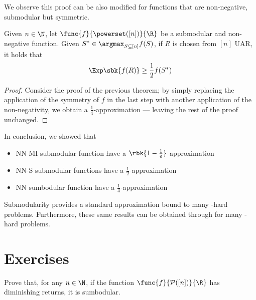 \documentclass[a4paper, 12pt]{report}
\begin{document}
    We observe this proof can be also modified for functions that are non-negative, submodular but  symmetric.

    \begin{framedthm}{}
        Given $n \in \N$, let $\func{f}{\powerset([n])}{\R}$ be a submodular and non-negative function. Given $\displaystyle S^* \in \argmax_{S \subseteq [n]}{f(S)}$, if $R$ is chosen from $[n]$ UAR, it holds that $$\Exp \sbk{f(R)} \ge \dfrac{1}{2}f(S^*)$$
    \end{framedthm}

    \begin{proof}
         Consider the proof of the previous theorem; by simply replacing the application of the symmetry of $f$ in the last step with another application of the non-negativity, we obtain a $\tfrac{1}{4}$-approximation --- leaving the rest of the proof unchanged.
    \end{proof}

    In conclusion, we showed that
    
    \begin{itemize}
        \item NN-MI submodular function have a $\rbk{1 - \tfrac{1}{e}}$-approximation
        \item NN-S submodular functions have a $\tfrac{1}{2}$-approximation
        \item NN sumbodular function have a $\tfrac{1}{4}$-approximation
    \end{itemize}

    Submodularity provides a standard approximation bound to many \NPclass-hard  problems. Furthermore, these same results can be obtained through  for many \NPclass-hard  problems.

    \section{Exercises}

    \begin{framedprob}[label={submod ex}]{}
        Prove that, for any $n \in \N$, if the function $\func{f}{\mathcal P([n])}{\R}$ has diminishing returns, it is sumbodular.
    \end{framedprob}
\end{document}
